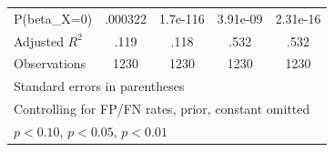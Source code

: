 {\begin{tabular}{l*{4}{c}}
\hline
P(beta\_X=0)     &  .000322         & 1.7e-116         & 3.91e-09         & 2.31e-16         \\
Adjusted \(R^{2}\)&     .119         &     .118         &     .532         &     .532         \\
Observations    &     1230         &     1230         &     1230         &     1230         \\
\hline\hline
\multicolumn{5}{l}{\footnotesize Standard errors in parentheses}\\
\multicolumn{5}{l}{\footnotesize Controlling for FP/FN rates, prior, constant omitted}\\
\multicolumn{5}{l}{\footnotesize \sym{*} \(p<0.10\), \sym{**} \(p<0.05\), \sym{***} \(p<0.01\)}\\
\end{tabular}
}
